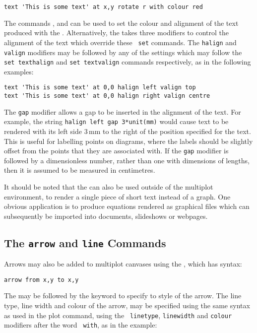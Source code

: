 \begin{verbatim}
text 'This is some text' at x,y rotate r with colour red
\end{verbatim}

The commands ,  and
 can be used to set the colour and alignment of the
text produced with the . Alternatively, the  takes
three modifiers to control the alignment of the text which override these {\tt
set} commands. The {\tt halign} and {\tt valign} modifiers may be followed by
any of the settings which may follow the {\tt set texthalign} and {\tt set
textvalign} commands respectively, as in the following examples:

\begin{verbatim}
text 'This is some text' at 0,0 halign left valign top
text 'This is some text' at 0,0 halign right valign centre
\end{verbatim}

\noindent The {\tt gap} modifier allows a gap to be inserted in the alignment
of the text. For example, the string {\tt halign left gap 3*unit(mm)} would
cause text to be rendered with its left side $3\,\mathrm{mm}$ to the right of
the position specified for the text. This is useful for labelling points on
diagrams, where the labels should be slightly offset from the points that they
are associated with. If the {\tt gap} modifier is followed by a dimensionless
number, rather than one with dimensions of lengths, then it is assumed to be
measured in centimetres.

It should be noted that the  can also be used outside of the
multiplot environment, to render a single piece of short text instead of a
graph. One obvious application is to produce equations rendered as graphical
files which can subsequently be imported into documents, slideshows or
webpages.

\subsection{The {\tt arrow} and {\tt line} Commands}

Arrows may also be added to multiplot canvases using the , which
has syntax:

\begin{verbatim}
arrow from x,y to x,y
\end{verbatim}

The  may be followed by the  keyword to specify to
style of the arrow. The line type, line width and colour of the arrow, may be
specified using the same syntax as used in the plot command, using the {\tt
linetype}, {\tt linewidth} and {\tt colour} modifiers after the word {\tt
with}, as in the example:

